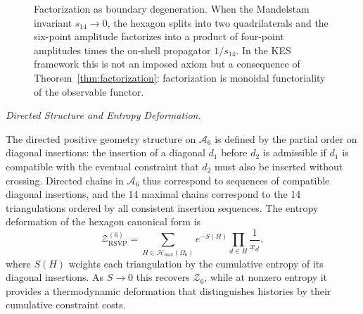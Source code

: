 \documentclass[11pt]{article}
\theoremstyle{plain}
\theoremstyle{definition}
\theoremstyle{remark}
\newcommand{\Sf}{S}
\newcommand{\OmKS}{\Omega}
\newcommand{\ZRSVP}{\mathcal{Z}_{\mathrm{RSVP}}}
\newcommand{\Hmax}{\mathcal{H}_{\max}}
\begin{document}
\begin{figure}[H]
\centering
{}
\caption{Factorization as boundary degeneration. When the Mandelstam
invariant $s_{14}\to 0$, the hexagon splits into two quadrilaterals and
the six-point amplitude factorizes into a product of four-point amplitudes
times the on-shell propagator $1/s_{14}$. In the KES framework this is
not an imposed axiom but a consequence of Theorem~\ref{thm:factorization}:
factorization is monoidal functoriality of the observable functor.}
\end{figure}

\medskip\noindent\textit{Directed Structure and Entropy Deformation.}

The directed positive geometry structure on $\mathcal{A}_6$ is defined by the partial order on diagonal insertions: the insertion of a diagonal $d_1$ before $d_2$ is admissible if $d_1$ is compatible with the eventual constraint that $d_2$ must also be inserted without crossing. Directed chains in $\mathcal{A}_6$ thus correspond to sequences of compatible diagonal insertions, and the 14 maximal chains correspond to the 14 triangulations ordered by all consistent insertion sequences. The entropy deformation of the hexagon canonical form is
\[
  \ZRSVP^{(6)} = \sum_{H \in \Hmax(\OmKS_6)} e^{-\Sf(H)} \prod_{d \in H} \frac{1}{x_d},
\]
where $\Sf(H)$ weights each triangulation by the cumulative entropy of its diagonal insertions. As $\Sf \to 0$ this recovers $\mathcal{Z}_6$, while at nonzero entropy it provides a thermodynamic deformation that distinguishes histories by their cumulative constraint costs.
\end{document}
